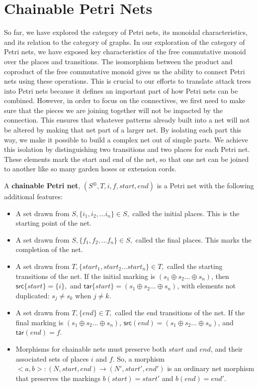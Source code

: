 \section{Chainable Petri Nets}
So far, we have explored the category of Petri nets, its monoidal characteristics, and its relation to the category of graphs. In our exploration of the category of Petri nets, we have exposed key characteristics of the free commutative monoid over the places and transitions. The isomorphism between the product and coproduct of the free commutative monoid gives us the ability to connect Petri nets using these operations. This is crucial to our efforts to translate attack trees into Petri nets because it defines an important part of how Petri nets can be combined. However, in order to focus on the connectives, we first need to make sure that the pieces we are joining together will not be impacted by the connection. This ensures that whatever patterns already built into a net will not be altered by making that net part of a larger net. By isolating each part this way, we make it possible to build a complex net out of simple parts. We achieve this isolation by distinguishing two transitions and two places for each Petri net. These elements mark the start and end of the net, so that one net can be joined to another like so many garden hoses or extension cords.  
\begin{definition}
  \label{Chainable-Petri-Net}
  A \textbf{chainable Petri net}, $(S^\oplus, T, i, f, start, end)$ is a Petri net with the following additional features: 
  \begin{itemize}
  \item A set drawn from $S, \{i_1, i_2, ... i_n\} \in S,$ called the initial places. This is the starting point of the net.
  \item A set drawn from $S, \{f_1, f_2, ... f_n\} \in S,$ called the final places. This marks the completion of the net.
  \item A set drawn from $T, \{start_1, start_2... start_n\} \in T,$ called the starting transitions of the net. If the initial marking is $(s_1 \oplus s_2 ... \oplus s_n)$, then $\mathsf{src}\{start\} = \{i\},$ and $\mathsf{tar}\{start\} = (s_1 \oplus s_2 ... \oplus s_n)$, with elements not duplicated: $s_j \neq s_k$ when $j \neq k$. %
  \item A set drawn from $T, \{end\} \in T,$ called the end transitions of the net. If the final marking is $(s_1 \oplus s_2 ... \oplus s_n)$, $\mathsf{src}(end) = (s_1 \oplus s_2 ... \oplus s_n)$, and $\mathsf{tar}(end) = f$. 
   \item Morphisms for chainable nets must preserve both $start$ and $end$, and their associated sets of places $i$ and $f$. So, a morphism $<a,b>: (N, start, end) \to (N', start', end')$ is an ordinary net morphism that preserves the markings $b(start) = start'$ and $b(end) = end'$. 
 \end{itemize}
\end{definition}
